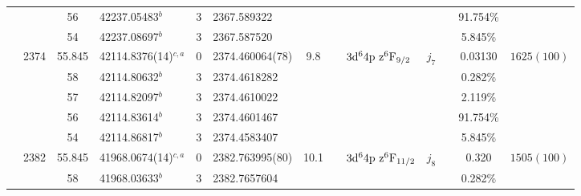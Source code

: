 \begin{table*}
\begin{center}
{\begin{tabular}{:l;l;c;l;c;l;c;l;l;c;c;c;c}
\rowstyle{\itshape}               &        & 56        & 42237.05483$^{b}$                & 3 &   2367.589322      &      & $                                        $ & $                                        $ & $      $ &              & 91.754\%  & $          $\\
\rowstyle{\itshape}               &        & 54        & 42237.08697$^{b}$                & 3 &   2367.587520      &      & $                                        $ & $                                        $ & $      $ &              & 5.845\%   & $          $\\
                                  & 2374   & 55.845    & 42114.8376(14)$^{c,a}$           & 0 &   2374.460064(78)  &  9.8 & $                                        $ & $3\rm{d}^64\rm{p~z}^6\rm{F}_{9/2}        $ & $j_{7} $ &              & 0.03130   & $ 1625(100)$\\
\rowstyle{\itshape}               &        & 58        & 42114.80632$^{b}$                & 3 &  2374.4618282      &      & $                                        $ & $                                        $ & $      $ &              & 0.282\%   & $          $\\
\rowstyle{\itshape}               &        & 57        & 42114.82097$^{b}$                & 3 &  2374.4610022      &      & $                                        $ & $                                        $ & $      $ &              & 2.119\%   & $          $\\
\rowstyle{\itshape}               &        & 56        & 42114.83614$^{b}$                & 3 &  2374.4601467      &      & $                                        $ & $                                        $ & $      $ &              & 91.754\%  & $          $\\
\rowstyle{\itshape}               &        & 54        & 42114.86817$^{b}$                & 3 &  2374.4583407      &      & $                                        $ & $                                        $ & $      $ &              & 5.845\%   & $          $\\
                                  & 2382   & 55.845    & 41968.0674(14)$^{c,a}$           & 0 &   2382.763995(80)  & 10.1 & $                                        $ & $3\rm{d}^64\rm{p~z}^6\rm{F}_{11/2}       $ & $j_{8} $ &              & 0.320     & $ 1505(100)$\\
\rowstyle{\itshape}               &        & 58        & 41968.03633$^{b}$                & 3 &  2382.7657604      &      & $                                        $ & $                                        $ & $      $ &              & 0.282\%   & $          $\\

\end{tabular}}
\end{center}
\end{table*}
